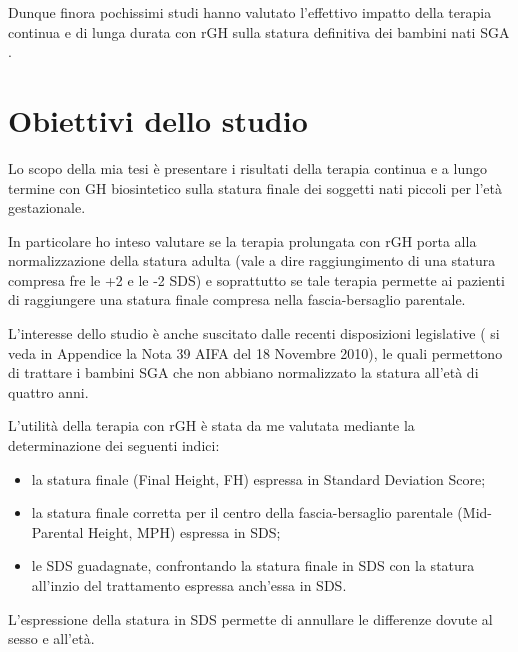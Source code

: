 Dunque finora pochissimi studi hanno valutato l'effettivo impatto della terapia continua e di lunga durata con rGH sulla statura definitiva dei bambini nati SGA . 


\section{Obiettivi dello studio}

Lo scopo della mia tesi è presentare i risultati della terapia continua e a lungo termine  con GH biosintetico sulla statura finale dei soggetti nati piccoli per l'età gestazionale.

In particolare ho inteso valutare se la terapia prolungata con rGH porta alla normalizzazione della statura adulta (vale a dire raggiungimento di una statura compresa fre le +2 e le -2 SDS) e soprattutto se tale terapia permette ai pazienti di raggiungere una statura finale compresa nella fascia-bersaglio parentale. 

L'interesse dello studio è anche suscitato dalle recenti disposizioni legislative ( si veda in Appendice la Nota 39 AIFA del 18 Novembre 2010), le quali permettono di trattare i bambini SGA che non abbiano normalizzato la statura all'età di quattro anni. 

L'utilità della terapia con rGH è stata da me valutata mediante la determinazione dei seguenti indici:

\begin{itemize}
\item la statura finale (Final Height, FH) espressa in Standard Deviation Score;
\item la statura finale  corretta per il centro della fascia-bersaglio parentale (Mid-Parental Height, MPH) espressa in SDS;
\item le SDS guadagnate, confrontando la statura finale in SDS con la statura all'inzio del trattamento espressa anch'essa in SDS.
\end{itemize}

L'espressione della statura in SDS permette di annullare le differenze dovute al sesso e all'età.

